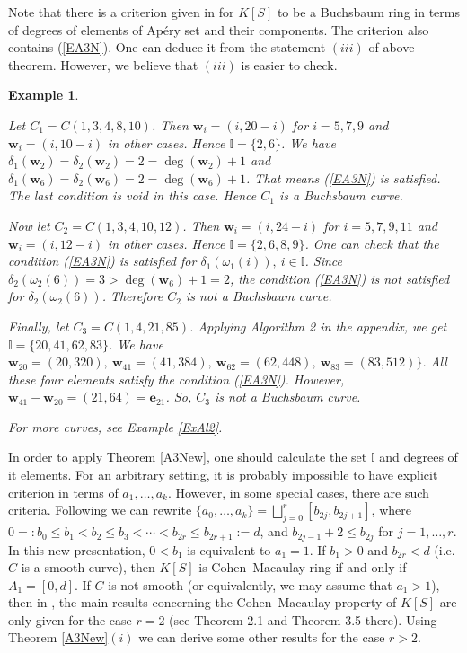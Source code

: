 \documentclass[11pt]{article}
\newtheorem{Example}[Theorem]{Example}
\def\deg{\operatorname{deg}}
\def\ebf{{\mathbf e}}
\def\wbf{{\mathbf w}}
\def\Iset{{\mathbb I}}
\theoremstyle{remark}
\theoremstyle{definition}
\begin{document}
Note that there is a criterion given in \cite[Theorem 3.1]{Br}  for $K[S]$ to be a Buchsbaum ring in terms of degrees of elements of Ap\'ery set and their components. The criterion also contains (\ref{EA3N}). One can deduce it from the statement \((iii)\) of above theorem. However, we believe that \((iii)\) is easier to check.

\begin{Example} \label{A3c1} {\rm Let $C_1 = C(1,3,4,8,10)$. Then $\wbf_i = (i, 20-i)$ for $i = 5,7,9$ and $\wbf_i = (i,10-i)$ in other cases. Hence $\Iset= \{2, 6 \}$. We have  $\delta_1(\wbf_2) = \delta_2(\wbf_2)  = 2 = \deg(\wbf_2) +1$ and  $\delta_1(\wbf_6) = \delta_2(\wbf_6)  = 2 = \deg(\wbf_6) +1$. That means  (\ref{EA3N}) is satisfied. The last condition is void in this case. Hence $C_1$ is a Buchsbaum curve.

Now let $C_2 = C(1,3,4,10,12)$. Then $\wbf_i = (i, 24-i)$ for $i = 5,7,9,11$ and $\wbf_i = (i,12-i)$ in other cases. Hence 
$\Iset= \{2,6, 8, 9\}$. One can check that the condition  (\ref{EA3N}) is satisfied for $\delta_1(\omega_1(i)),\ i\in \Iset$. Since $\delta_2(\omega_2(6)) =  3 > \deg(\wbf_6) + 1=2$, the condition  (\ref{EA3N}) is not satisfied for $\delta_2(\omega_2(6))$. Therefore $C_2$ is not a Buchsbaum curve.

Finally, let $C_3= C(1,4,21,85)$. Applying Algorithm 2 in the appendix, we get  $\Iset =\{20, 41, 62, 83\}$. We have $ \wbf_{20} = (20, 320),\ \wbf_{41}= (41,384),\ \wbf_{62} = (62, 448),\ \wbf_{83} = (83,512)\}$. All these four elements satisfy the condition (\ref{EA3N}). However,  $\wbf_{41} - \wbf_{20} = (21,64) = \ebf_{21}$. So, $C_3$ is not a Buchsbaum curve. 

For more curves, see Example \ref{ExAl2}. }
\end{Example}


In order to apply  Theorem \ref{A3New}, one should calculate the set $\Iset$ and degrees of it elements. For an arbitrary setting, it is  probably impossible to have explicit criterion in terms of $a_1,\ldots,a_k$. However, in some special cases, there are such criteria. Following \cite{T, LT} we can rewrite $\{a_0,\ldots,a_k\} = \bigsqcup_{j=0}^r [b_{2j},b_{2j+1}]$, where $0=:b_0 \leq b_1 < b_2 \leq b_3 < \cdots < b_{2r}\leq b_{2r+1} := d$, and $b_{2j-1} + 2 \leq b_{2j}$ for $j=1,\ldots,r$. In this new presentation, $0 < b_1$ is equivalent to $a_1 = 1$. If $b_1 > 0$ and $b_{2r} < d$ (i.e. $C$ is a smooth curve), then $K[S]$ is Cohen--Macaulay ring if and only if $A_1 = [0,d]$. If $C$ is not smooth (or equivalently, we may assume that $a_1 > 1$), then in \cite{T}, the main results concerning the Cohen--Macaulay property of $K[S]$ are only given  for  the case $r=2$ (see Theorem 2.1 and Theorem 3.5 there). Using Theorem \ref{A3New}\((i)\) we can derive some other results for the case $r> 2$.
\end{document}
